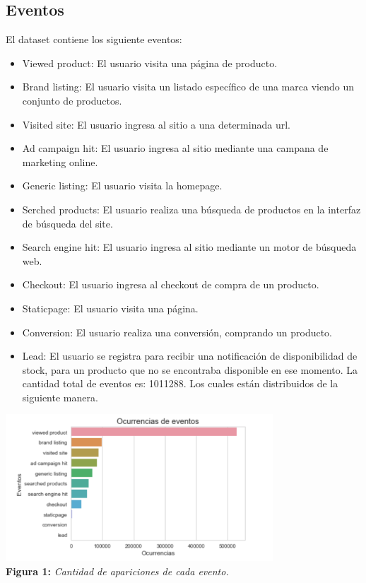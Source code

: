 \documentclass[titlepage,a4paper]{article}
\begin{document}
	\subsection{Eventos}
	El dataset contiene los siguiente eventos: 
	\begin{itemize}
	\item Viewed product: El usuario visita una página de producto.
	\item Brand listing: El usuario visita un listado específico de una marca viendo un conjunto de productos.
	\item Visited site: El usuario ingresa al sitio a una determinada url.
	\item Ad campaign hit:  El usuario ingresa al sitio mediante una campana de marketing online.
	\item Generic listing:  El usuario visita la homepage.
	\item Serched products:  El usuario realiza una búsqueda de productos en la interfaz de búsqueda del site.
	\item Search engine hit: El usuario ingresa al sitio mediante un motor de búsqueda web.
	\item Checkout: El usuario ingresa al checkout de compra de un producto.
	\item Staticpage: El usuario visita una página.
	\item Conversion: El usuario realiza una conversión, comprando un producto.
	\item Lead: El usuario se registra para recibir una notificación de disponibilidad de stock, para un producto que no se encontraba disponible en ese momento.
	\newpage
	La cantidad total de eventos es: 	1011288. Los cuales están distribuidos de la siguiente manera. 
	\end{itemize}
	\begin{center}
	\includegraphics[width=10cm]{ocurrencia_eventos.jpg}\\
	\textbf{Figura 1:}  \textit{Cantidad de apariciones de cada evento. }
	\end{center}
\end{document}
